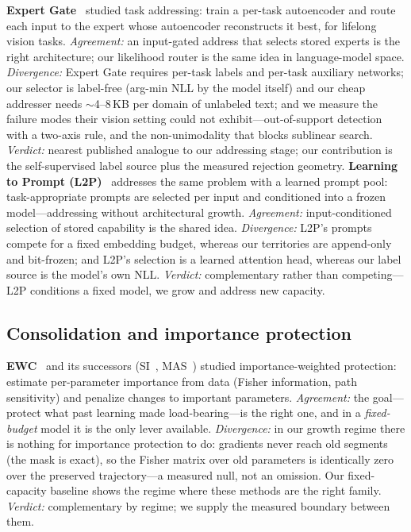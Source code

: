 \documentclass[11pt]{article}
\theoremstyle{definition}\newtheorem{definition}{Definition}
\theoremstyle{remark}\newtheorem{remark}{Remark}
\begin{document}
\textbf{Expert Gate}~\cite{expertgate} studied task addressing: train a per-task
autoencoder and route each input to the expert whose autoencoder reconstructs it best,
for lifelong vision tasks. \emph{Agreement:} an input-gated address that selects stored
experts is the right architecture; our likelihood router is the same idea in language-model
space. \emph{Divergence:} Expert Gate requires per-task labels and per-task auxiliary
networks; our selector is label-free (arg-min NLL by the model itself) and our cheap
addresser needs $\sim$4--8\,KB per domain of unlabeled text; and we measure the failure
modes their vision setting could not exhibit---out-of-support detection with a two-axis
rule, and the non-unimodality that blocks sublinear search. \emph{Verdict:} nearest
published analogue to our addressing stage; our contribution is the self-supervised label
source plus the measured rejection geometry. \textbf{Learning to Prompt (L2P)}~\cite{l2p} addresses the same problem with a learned prompt pool: task-appropriate prompts are selected per input and conditioned into a frozen model---addressing without architectural growth. \emph{Agreement:} input-conditioned selection of stored capability is the shared idea. \emph{Divergence:} L2P's prompts compete for a fixed embedding budget, whereas our territories are append-only and bit-frozen; and L2P's selection is a learned attention head, whereas our label source is the model's own NLL. \emph{Verdict:} complementary rather than competing---L2P conditions a fixed model, we grow and address new capacity.

\subsection{Consolidation and importance protection}
\label{sec:prior:consolidation}

\textbf{EWC}~\cite{ewc} and its successors (SI~\cite{si}, MAS~\cite{mas}) studied
importance-weighted protection: estimate per-parameter importance from data (Fisher
information, path sensitivity) and penalize changes to important parameters. \emph{Agreement:}
the goal---protect what past learning made load-bearing---is the right one, and in a
\emph{fixed-budget} model it is the only lever available. \emph{Divergence:} in our growth
regime there is nothing for importance protection to do: gradients never reach old
segments (the mask is exact), so the Fisher matrix over old parameters is identically zero
over the preserved trajectory---a measured null, not an omission. Our fixed-capacity
baseline shows the regime where these methods are the right family. \emph{Verdict:}
complementary by regime; we supply the measured boundary between them.
\end{document}
